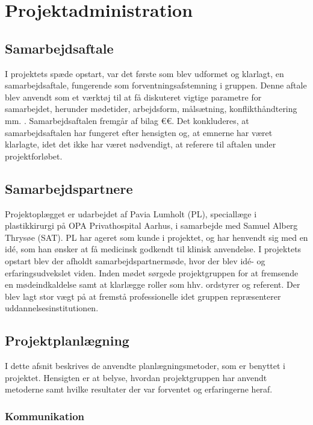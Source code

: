 \chapter{Projektadministration}

\section{Samarbejdsaftale}
I projektets spæde opstart, var det første som blev udformet og klarlagt, en samarbejdsaftale, fungerende som forventningsafstemning i gruppen. Denne aftale blev anvendt som et værktøj til at få diskuteret vigtige parametre for samarbejdet, herunder mødetider, arbejdsform, målsætning, konflikthåndtering mm. \citep{RefWorks:12}. Samarbejdsaftalen fremgår af bilag €€. 
Det konkluderes, at samarbejdsaftalen har fungeret efter hensigten og, at emnerne har været klarlagte, idet det ikke har været nødvendigt, at referere til aftalen under projektforløbet.   
	
\section{Samarbejdspartnere}

	Projektoplægget er udarbejdet af Pavia Lumholt (PL), speciallæge i plastikkirurgi på OPA Privathospital Aarhus, i samarbejde med Samuel Alberg Thrysøe (SAT). PL har ageret som kunde i projektet, og har henvendt sig med en idé, som han ønsker at få medicinsk godkendt til klinisk anvendelse. I projektets opstart blev der afholdt samarbejdspartnermøde, hvor der blev idé- og erfaringsudvekslet viden. Inden mødet sørgede projektgruppen for at fremsende en mødeindkaldelse samt at klarlægge roller som hhv. ordstyrer og referent. Der blev lagt stor vægt på at fremstå professionelle idet gruppen repræsenterer uddannelsesinstitutionen.        
	
\section{Projektplanlægning}
	I dette afsnit beskrives de anvendte planlægningsmetoder, som er benyttet i projektet. Hensigten er at belyse, hvordan projektgruppen har anvendt metoderne samt hvilke resultater der var forventet og erfaringerne heraf.  

\subsection{Kommunikation}

